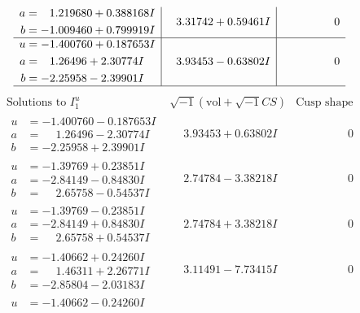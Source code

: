 \documentclass[1p]{elsarticle_modified}
\theoremstyle{definition}
\newcommand{\I}{\sqrt{-1}}
\begin{document}
$$\begin{array}{c|c|c}
\begin{aligned}
a &= \phantom{-}1.219680 + 0.388168 I \\
b &= -1.009460 + 0.799919 I\end{aligned}
 & \phantom{-}3.31742 + 0.59461 I & \phantom{-0.000000 } 0 \\ \hline\begin{aligned}
u &= -1.400760 + 0.187653 I \\
a &= \phantom{-}1.26496 + 2.30774 I \\
b &= -2.25958 - 2.39901 I\end{aligned}
 & \phantom{-}3.93453 - 0.63802 I & \phantom{-0.000000 } 0\\
 \hline 
 \end{array}$$\newpage$$\begin{array}{c|c|c}  
\text{Solutions to }I^u_{1}& \I (\text{vol} + \sqrt{-1}CS) & \text{Cusp shape}\\
 \hline 
\begin{aligned}
u &= -1.400760 - 0.187653 I \\
a &= \phantom{-}1.26496 - 2.30774 I \\
b &= -2.25958 + 2.39901 I\end{aligned}
 & \phantom{-}3.93453 + 0.63802 I & \phantom{-0.000000 } 0 \\ \hline\begin{aligned}
u &= -1.39769 + 0.23851 I \\
a &= -2.84149 - 0.84830 I \\
b &= \phantom{-}2.65758 - 0.54537 I\end{aligned}
 & \phantom{-}2.74784 - 3.38218 I & \phantom{-0.000000 } 0 \\ \hline\begin{aligned}
u &= -1.39769 - 0.23851 I \\
a &= -2.84149 + 0.84830 I \\
b &= \phantom{-}2.65758 + 0.54537 I\end{aligned}
 & \phantom{-}2.74784 + 3.38218 I & \phantom{-0.000000 } 0 \\ \hline\begin{aligned}
u &= -1.40662 + 0.24260 I \\
a &= \phantom{-}1.46311 + 2.26771 I \\
b &= -2.85804 - 2.03183 I\end{aligned}
 & \phantom{-}3.11491 - 7.73415 I & \phantom{-0.000000 } 0 \\ \hline\begin{aligned}
u &= -1.40662 - 0.24260 I \\

\end{aligned}
\end{array}$$
\end{document}
